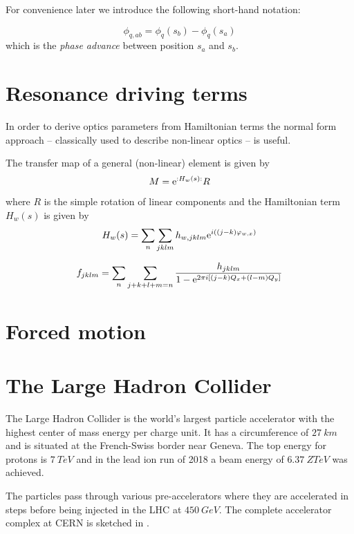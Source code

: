 For convenience later we introduce the following short-hand notation:

\begin{equation}
    \phi_{q,ab} = \phi_q(s_b) - \phi_q(s_a)
\end{equation}
which is the \emph{phase advance} between position $s_a$ and $s_b$.


\section{Resonance driving terms}

In order to derive optics parameters from Hamiltonian terms the normal form approach -- classically
used to describe non-linear optics -- is useful. 

The transfer map of a general (non-linear) element is given by
\begin{equation}
    M= \text{e}^{:H_w(s):}R
\end{equation}
where $R$ is the simple rotation of linear components and the Hamiltonian term $H_w(s)$ is given by
\begin{equation}
    H_w(s) = \sum\limits_n\sum\limits_{jklm} h_{w,jklm}\text{e}^{i\left((j-k)\varphi_{w,x}\right)}
\end{equation}

\begin{equation}
    f_{jklm}=\sum\limits_{n}\sum\limits_{j+k+l+m=n} \frac{h_{jklm} }{1-\text{e}^{2\pi i [(j-k)Q_x+(l-m)Q_y]}}
\end{equation}


\section{Forced motion}

\section{The Large Hadron Collider}

The Large Hadron Collider is the world's largest particle accelerator with the highest center of mass
energy per charge unit. It has a circumference of $\SI{27}{km}$ and is situated at the French-Swiss 
border near Geneva. The top energy for protons is $\SI{7}{TeV}$
and in the lead ion run of 2018 a beam energy of $\SI{6.37}{Z TeV}$ was achieved.

The particles pass through various pre-accelerators where they are accelerated in steps before being
injected in the LHC at $\SI{450}{GeV}$. The complete accelerator complex at CERN is sketched in
.

